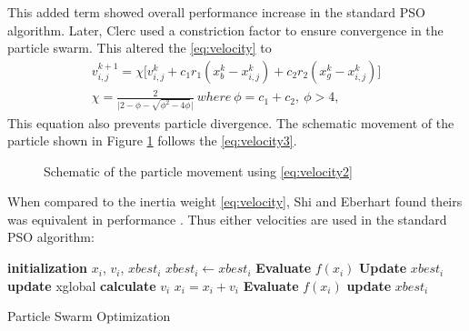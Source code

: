 This added term showed overall performance increase in the standard PSO algorithm. Later, Clerc \cite{} used a constriction factor to ensure convergence in the particle swarm. This altered the \eqref{eq:velocity} to 
\begin{align}
    \label{eq:velocity3}
    v^{k+1}_{i,j} = \chi \big[ v^{k}_{i,j} + c_1r_1(x^{k}_b - x^{k}_{i,j}) + c_2r_2(x^{k}_g - x^{k}_{i,j}) \big] \\
    \chi = \frac{2}{\big| 2- \phi - \sqrt{\phi^2 - 4\phi}\big|}\ where\ \phi = c_1 + c_2,\ \phi>4, \nonumber
\end{align}
This equation also prevents particle divergence. The schematic movement of the particle shown in Figure \ref{fig:particle movement} follows the \eqref{eq:velocity3}.

\begin{figure}[!h]
    \centering
    
    \caption{Schematic of the particle movement using \eqref{eq:velocity2}}
    \label{fig:particle movement}
\end{figure}

When compared to the inertia weight \eqref{eq:velocity}, Shi and Eberhart found theirs was equivalent in performance \cite{Shi}. 
Thus either velocities are used in the standard PSO algorithm: 
\begin{algorithm}[H]
  \begin{algorithmic}[1]

        \State \textbf{initialization} $x_i$, $v_i$, $xbest_i$ 
        $xbest_i \gets xbest_i$
        \State \textbf{Evaluate} $f(x_i)$  
        \State \textbf{Update} $xbest_i$ 
    \EndFor
            \State \textbf{update} xglobal 
            \State \textbf{calculate} $v_i$ 
            \State $x_i = x_i + v_i$
            \State \textbf{Evaluate} $f(x_i)$
            \State \textbf{update} $xbest_i$
        \EndFor
    \EndWhile
  \end{algorithmic}
\caption{Particle Swarm Optimization}
\label{algorithmPSO}
\end{algorithm}

